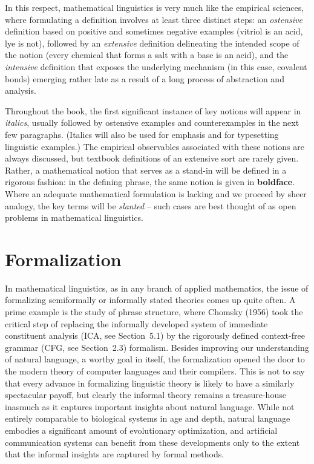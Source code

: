 In this respect, mathematical linguistics is very much like the empirical
sciences, where formulating a definition involves at least three distinct
steps: an {\it ostensive} definition based on positive and sometimes negative
examples (vitriol is an acid, lye is not), followed by an {\it extensive}
definition delineating the intended scope of the notion (every chemical that
forms a salt with a base is an acid), and the {\it intensive} definition that
exposes the underlying mechanism (in this case, covalent bonds) emerging
rather late as a result of a long process of abstraction and analysis.
  

Throughout the book, the first significant instance of key notions will appear
in {\it italics}, usually followed by ostensive examples and counterexamples
in the next few paragraphs. (Italics will also be used for emphasis and for
typesetting linguistic examples.) The empirical observables associated with
these notions are always discussed, but textbook definitions of an extensive
sort are rarely given. Rather, a mathematical notion that serves as a stand-in
will be defined in a rigorous fashion: in the defining phrase, the same notion
is given in {\bf boldface}. Where an adequate mathematical formulation is
lacking and we proceed by sheer analogy, the key terms will be {\sl slanted}
-- such cases are best thought of as open problems in mathematical
linguistics. 

\section{Formalization} 

In mathematical linguistics, as in any branch of applied mathematics, the
issue of formalizing semiformally or informally stated theories comes up quite
often. A prime example is the study of phrase structure, where Chomsky (1956)
took the critical step of replacing the informally developed system of
immediate constituent analysis (ICA, see Section~5.1) by the rigorously
defined context-free grammar (CFG, see Section~2.3) formalism. Besides
improving our understanding of natural language, a worthy goal in itself, the
formalization opened the door to the modern theory of computer languages and
their compilers. This is not to say that every advance in formalizing
linguistic theory is likely to have a similarly spectacular payoff, but
clearly the informal theory remains a treasure-house inasmuch as it captures
important insights about natural language. While not entirely comparable to
biological systems in age and depth, natural language embodies a significant
amount of evolutionary optimization, and artificial communication systems can
benefit from these developments only to the extent that the informal insights
are captured by formal methods.

